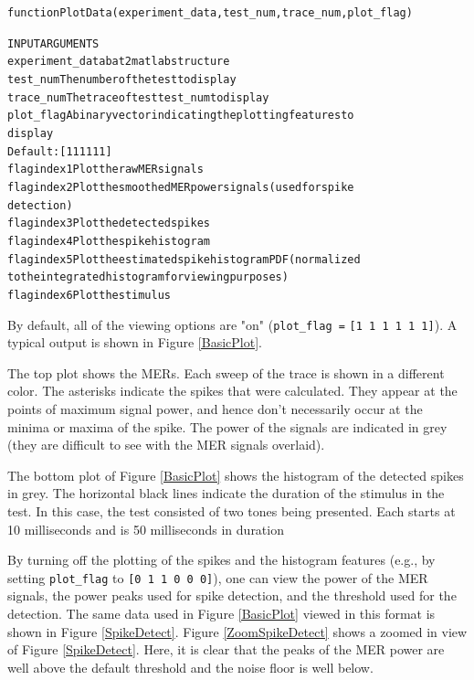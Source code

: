 \documentclass[11pt,letterpaper]{article}
\begin{document}
\begin{footnotesize}
\begin{alltt}
function PlotData(experiment_data, test_num, trace_num, plot_flag)

   INPUT ARGUMENTS
   experiment_data     bat2matlab structure
   test_num            The number of the test to display
   trace_num           The trace of test test_num to display
   plot_flag           A binary vector indicating the plotting features to
                       display
                       Default: [1 1 1 1 1 1]
       flag index 1    Plot the raw MER signals
       flag index 2    Plot the smoothed MER power signals (used for spike
                       detection)
       flag index 3    Plot the detected spikes
       flag index 4    Plot the spike histogram
       flag index 5    Plot the estimated spike histogram PDF (normalized
                       to the integrated histogram for viewing purposes)
       flag index 6    Plot the stimulus
\end{alltt}
\end{footnotesize}
By default, all of the viewing options are "on" (\verb"plot_flag ="
\verb"[1 1 1 1 1 1]"). A typical output is shown in Figure
\ref{BasicPlot}.

The top plot shows the MERs. Each sweep of the trace is shown in a
different color. The asterisks indicate the spikes that were
calculated. They appear at the points of maximum signal power, and
hence don't necessarily occur at the minima or maxima of the spike.
The power of the signals are indicated in grey (they are difficult
to see with the MER signals overlaid).

The bottom plot of Figure \ref{BasicPlot} shows the histogram of the
detected spikes in grey. The horizontal black lines indicate the
duration of the stimulus in the test. In this case, the test
consisted of two tones being presented. Each starts at 10
milliseconds and is 50 milliseconds in duration

By turning off the plotting of the spikes and the histogram features
(e.g., by setting \verb"plot_flag" to \verb"[0 1 1 0 0 0]"), one can
view the power of the MER signals, the power peaks used for spike
detection, and the threshold used for the detection. The same data
used in Figure \ref{BasicPlot} viewed in this format is shown in
Figure \ref{SpikeDetect}. Figure \ref{ZoomSpikeDetect} shows a
zoomed in view of Figure \ref{SpikeDetect}. Here, it is clear that
the peaks of the MER power are well above the default threshold and
the noise floor is well below.
\end{document}

